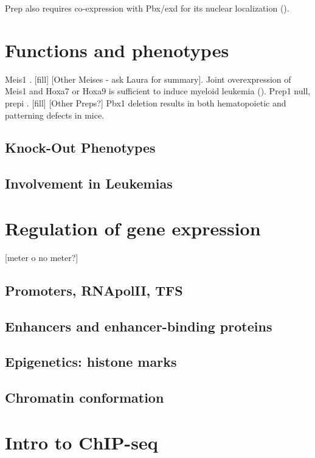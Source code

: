 Prep also requires co-expression with Pbx/exd for its nuclear localization (\cite{Berthelsen1999}). 



\section{Functions and phenotypes}

		Meis1  \cite{Azcoitia2005, Carramolino2010}. [fill] [Other Meises - ask Laura for summary]. Joint overexpression of Meis1 and Hoxa7 or Hoxa9 is sufficient to induce myeloid leukemia (\cite{Nakamura1996}).
		Prep1 null, \ac{prepi} \cite{Ferretti2006, Fernandez-Diaz2010, Longobardi2010}. [fill] [Other Preps?]
		Pbx1 deletion results in both hematopoietic \cite{DiMartino2001} and patterning \cite{Selleri et al. 2001} defects in mice.
		
\subsection{Knock-Out Phenotypes}

\subsection{Involvement in Leukemias}


\section{Regulation of gene expression}
[meter o no meter?]
\subsection{Promoters, RNApolII, TFS}

\subsection{Enhancers and enhancer-binding proteins}

\subsection{Epigenetics: histone marks}

\subsection{Chromatin conformation}

\section{Intro to ChIP-seq}

